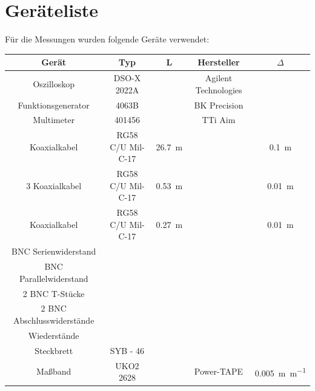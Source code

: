 \documentclass[11pt,ngerman]{scrartcl}
\begin{document}
\newpage

\section{Geräteliste}

\noindent Für die Messungen wurden folgende Geräte verwendet:

\begin{table}[H]
	\begin{center}
		\begin{tabular}{|c|c|c|c|c|} \hline
			\textbf{Gerät}             & \textbf{Typ}      & \textbf{L}    & \textbf{Hersteller}  & $\Delta$              \\ \hline

			Oszilloskop                & DSO-X 2022A       &               & Agilent Technologies &                       \\ \hline
			Funktionsgenerator         & 4063B             &               & BK Precision         &                       \\ \hline
			Multimeter                 & 401456            &               & TTi Aim              &                       \\ \hline
			Koaxialkabel               & RG58 C/U Mil-C-17 & \SI{26.7}{\m} &                      & \SI{0.1}{\m}          \\ \hline
			3 Koaxialkabel             & RG58 C/U Mil-C-17 & \SI{0.53}{\m} &                      & \SI{0.01}{\m}         \\ \hline
			Koaxialkabel               & RG58 C/U Mil-C-17 & \SI{0.27}{\m} &                      & \SI{0.01}{\m}         \\ \hline
			BNC Serienwiderstand       &                   &               &                      &                       \\ \hline
			BNC Parallelwiderstand     &                   &               &                      &                       \\ \hline
			2 BNC T-Stücke             &                   &               &                      &                       \\ \hline
			2 BNC Abschlusswiderstände &                   &               &                      &                       \\ \hline
			Wiederstände               &                   &               &                      &                       \\ \hline
			Steckbrett                 & SYB - 46          &               &                      &                       \\ \hline
			Maßband                    & UKO2 2628         &               & Power-TAPE           & \SI{0.005}{\m\per\m } \\ \hline
		\end{tabular}
	\end{center}
	\label{tab:material}
\end{table}
\end{document}
